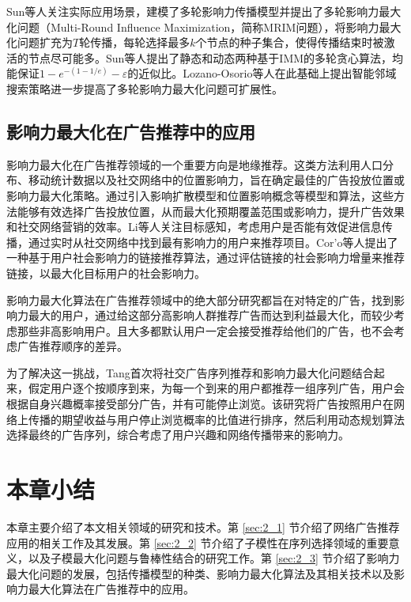 Sun等人关注实际应用场景，建模了多轮影响力传播模型并提出了多轮影响力最大化问题（Multi-Round Influence Maximization，简称MRIM问题）\parencite{sun2018multi}，将影响力最大化问题扩充为$T$轮传播，每轮选择最多$k$个节点的种子集合，使得传播结束时被激活的节点尽可能多。Sun等人提出了静态和动态两种基于IMM的多轮贪心算法，均能保证$1-e^{-(1-1/e)}-\varepsilon$的近似比。Lozano-Osorio等人\cite{lozano2022multi}在此基础上提出智能邻域搜索策略进一步提高了多轮影响力最大化问题可扩展性。


\subsection{影响力最大化在广告推荐中的应用}

影响力最大化在广告推荐领域的一个重要方向是地缘推荐\cite{zhang2020geodemographic,zeng2021business,saleem2019effective}。这类方法利用人口分布、移动统计数据以及社交网络中的位置影响力，旨在确定最佳的广告投放位置或影响力最大化策略。通过引入影响扩散模型和位置影响概念等模型和算法，这些方法能够有效选择广告投放位置，从而最大化预期覆盖范围或影响力，提升广告效果和社交网络营销的效率。Li等人\cite{li2015real}关注目标感知，考虑用户是否能有效促进信息传播，通过实时从社交网络中找到最有影响力的用户来推荐项目。Cor{'o}等人\cite{coro2021link}提出了一种基于用户社会影响力的链接推荐算法，通过评估链接的社会影响力增量来推荐链接，以最大化目标用户的社会影响力。

影响力最大化算法在广告推荐领域中的绝大部分研究都旨在对特定的广告，找到影响力最大的用户，通过给这部分高影响人群推荐广告而达到利益最大化，而较少考虑那些非高影响用户。且大多都默认用户一定会接受推荐给他们的广告，也不会考虑广告推荐顺序的差异。

为了解决这一挑战，Tang\cite{tang2018social}首次将社交广告序列推荐和影响力最大化问题结合起来，假定用户逐个按顺序到来，为每一个到来的用户都推荐一组序列广告，用户会根据自身兴趣概率接受部分广告，并有可能停止浏览。该研究将广告按照用户在网络上传播的期望收益与用户停止浏览概率的比值进行排序，然后利用动态规划算法选择最终的广告序列，综合考虑了用户兴趣和网络传播带来的影响力。

\section{本章小结}

本章主要介绍了本文相关领域的研究和技术。第 \ref{sec:2_1} 节介绍了网络广告推荐应用的相关工作及其发展。第 \ref{sec:2_2} 节介绍了子模性在序列选择领域的重要意义，以及子模最大化问题与鲁棒性结合的研究工作。第 \ref{sec:2_3} 节介绍了影响力最大化问题的发展，包括传播模型的种类、影响力最大化算法及其相关技术以及影响力最大化算法在广告推荐中的应用。



